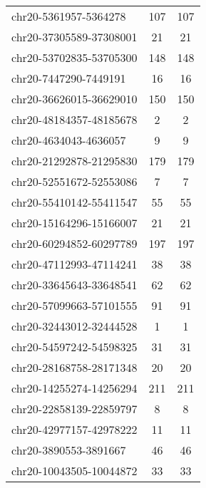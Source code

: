 \begin{longtable}{lSS}
	chr20-5361957-5364278   & 107    & 107                                 \\
	chr20-37305589-37308001 & 21     & 21                                  \\
	chr20-53702835-53705300 & 148    & 148                                 \\
	chr20-7447290-7449191   & 16     & 16                                  \\
	chr20-36626015-36629010 & 150    & 150                                 \\
	chr20-48184357-48185678 & 2      & 2                                   \\
	chr20-4634043-4636057   & 9      & 9                                   \\
	chr20-21292878-21295830 & 179    & 179                                 \\
	chr20-52551672-52553086 & 7      & 7                                   \\
	chr20-55410142-55411547 & 55     & 55                                  \\
	chr20-15164296-15166007 & 21     & 21                                  \\
	chr20-60294852-60297789 & 197    & 197                                 \\
	chr20-47112993-47114241 & 38     & 38                                  \\
	chr20-33645643-33648541 & 62     & 62                                  \\
	chr20-57099663-57101555 & 91     & 91                                  \\
	chr20-32443012-32444528 & 1      & 1                                   \\
	chr20-54597242-54598325 & 31     & 31                                  \\
	chr20-28168758-28171348 & 20     & 20                                  \\
	chr20-14255274-14256294 & 211    & 211                                 \\
	chr20-22858139-22859797 & 8      & 8                                   \\
	chr20-42977157-42978222 & 11     & 11                                  \\
	chr20-3890553-3891667   & 46     & 46                                  \\
	chr20-10043505-10044872 & 33     & 33                                  \\

\end{longtable}
